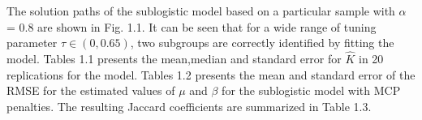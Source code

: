 \documentclass[11pt,onside,a4paper,fleqn]{report}
\begin{document}
\hspace{0.8cm}The solution paths of the sublogistic model based on a particular sample with $\alpha$ = 0.8 are
shown in Fig. 1.1. It can be seen that for a wide range of tuning parameter $\tau \in (0, 0.65)$, two subgroups are correctly identified by
fitting the model. Tables 1.1 presents the mean,median and standard error for $\hat{K}$ in 20 replications for the model. 
Tables 1.2 presents the mean and standard error of the RMSE for the estimated values of $\mu$ and $\beta$ for the sublogistic model with MCP penalties. The resulting
Jaccard coefficients are summarized in Table 1.3.
\begin{figure}[htbp]
      \centering
      \quad
\end{figure}
\end{document}
